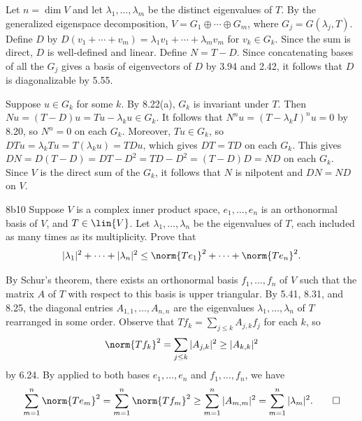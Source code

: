 \begin{sol}
    Let $n = \dim V$ and let $\lambda_1, \ldots, \lambda_m$ be the distinct eigenvalues of $T$.
    By the generalized eigenspace decomposition, $V = G_1 \oplus \cdots \oplus G_m$, where $G_j = G(\lambda_j, T)$.
    Define $D$ by $D(v_1 + \cdots + v_m) = \lambda_1 v_1 + \cdots + \lambda_m v_m$ for $v_k \in G_k$.
    Since the sum is direct, $D$ is well-defined and linear.
    Define $N = T - D$.
    Since concatenating bases of all the $G_j$ gives a basis of eigenvectors of $D$ by 3.94 and 2.42, it follows that $D$ is diagonalizable by 5.55.

    Suppose $u \in G_k$ for some $k$.
    By 8.22(a), $G_k$ is invariant under $T$.
    Then $N u = (T - D) u = T u - \lambda_k u \in G_k$.
    It follows that $N^n u = (T - \lambda_k I)^n u = 0$ by 8.20, so $N^n = 0$ on each $G_k$.
    Moreover, $T u \in G_k$, so $D T u = \lambda_k T u = T (\lambda_k u) = T D u$, which gives $D T = T D$ on each $G_k$.
    This gives $DN = D(T - D) = DT - D^2 = TD - D^2 = (T - D)D = ND$ on each $G_k$.
    Since $V$ is the direct sum of the $G_k$, it follows that $N$ is nilpotent and $DN = ND$ on $V$.
\end{sol}

\begin{exercise}{8b10}
    Suppose $V$ is a complex inner product space, $e_1, \ldots, e_n$ is an orthonormal basis of $V$, and $T \in \lin{V}$.
    Let $\lambda_1, \ldots, \lambda_n$ be the eigenvalues of $T$, each included as many times as its multiplicity.
    Prove that
    \[
        |\lambda_1|^2 + \cdots + |\lambda_n|^2 \leq \norm{Te_1}^2 + \cdots + \norm{Te_n}^2.
    \]

\end{exercise}

\begin{sol}
    By Schur's theorem, there exists an orthonormal basis $f_1, \ldots, f_n$ of $V$ such that the matrix $A$ of $T$ with respect to this basis is upper triangular.
    By 5.41, 8.31, and 8.25, the diagonal entries $A_{1, 1}, \ldots, A_{n, n}$ are the eigenvalues $\lambda_1, \ldots, \lambda_n$ of $T$ rearranged in some order.
    Observe that $T f_k = \sum_{j \leq k} A_{j, k} f_j$ for each $k$, so
    \[
        \norm{T f_k}^2 = \sum_{j \leq k} |A_{j, k}|^2 \geq |A_{k, k}|^2
    \]
    by 6.24.
    By  applied to both bases $e_1, \ldots, e_n$ and $f_1, \ldots, f_n$, we have
    \[
        \sum_{m=1}^n \norm{T e_m}^2 = \sum_{m=1}^n \norm{T f_m}^2 \geq \sum_{m=1}^n |A_{m, m}|^2 = \sum_{m=1}^n |\lambda_m|^2. \qedhere
    \]
\end{sol}

